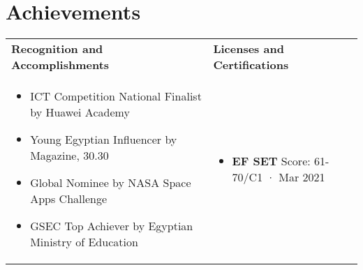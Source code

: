 \documentclass[letterpaper,11pt]{article}
\begin{document}
\section{Achievements}
\renewcommand{\arraystretch}{-20}
\begin{tabularx}{\textwidth}{p{}p{}}
    \textbf{Recognition and Accomplishments} & \textbf{Licenses and Certifications}  \\ \vspace{-10}
    \small
    \begin{itemize}[leftmargin=0, label={}, itemsep=0, parsep=0pt]
        \item ICT Competition National Finalist by Huawei Academy
        \item Young Egyptian Influencer by Magazine, 30.30
        \item Global Nominee by NASA Space Apps Challenge
        \item GSEC Top Achiever by Egyptian Ministry of Education
    \end{itemize}
    & \begin{comment}
        
    \end{comment}
    \small  \vspace{-10}
    \begin{itemize}[leftmargin=0, label={}, itemsep=0, parsep=0pt]
        \item \textbf{EF SET} Score: 61-70/C1 · Mar 2021
    \end{itemize}
\end{tabularx}
\vspace{-25pt}

\end{document}
